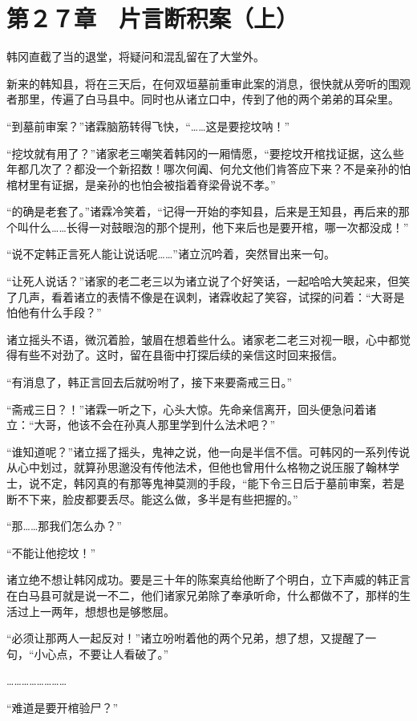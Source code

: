 \section{第２７章　片言断积案（上）}

韩冈直截了当的退堂，将疑问和混乱留在了大堂外。

新来的韩知县，将在三天后，在何双垣墓前重审此案的消息，很快就从旁听的围观者那里，传遍了白马县中。同时也从诸立口中，传到了他的两个弟弟的耳朵里。

“到墓前审案？”诸霖脑筋转得飞快，“……这是要挖坟呐！”

“挖坟就有用了？”诸家老三嘲笑着韩冈的一厢情愿，“要挖坟开棺找证据，这么些年都几次了？都没一个新招数！哪次何阗、何允文他们肯答应下来？不是亲孙的怕棺材里有证据，是亲孙的也怕会被指着脊梁骨说不孝。”

“的确是老套了。”诸霖冷笑着，“记得一开始的李知县，后来是王知县，再后来的那个叫什么……长得一对鼓眼泡的那个提刑，他下来后也是要开棺，哪一次都没成！”

“说不定韩正言死人能让说话呢……”诸立沉吟着，突然冒出来一句。

“让死人说话？”诸家的老二老三以为诸立说了个好笑话，一起哈哈大笑起来，但笑了几声，看着诸立的表情不像是在讽刺，诸霖收起了笑容，试探的问着：“大哥是怕他有什么手段？”

诸立摇头不语，微沉着脸，皱眉在想着些什么。诸家老二老三对视一眼，心中都觉得有些不对劲了。这时，留在县衙中打探后续的亲信这时回来报信。

“有消息了，韩正言回去后就吩咐了，接下来要斋戒三日。”

“斋戒三日？！”诸霖一听之下，心头大惊。先命亲信离开，回头便急问着诸立：“大哥，他该不会在孙真人那里学到什么法术吧？”

“谁知道呢？”诸立摇了摇头，鬼神之说，他一向是半信不信。可韩冈的一系列传说从心中划过，就算孙思邈没有传他法术，但他也曾用什么格物之说压服了翰林学士，说不定，韩冈真的有那等鬼神莫测的手段，“能下令三日后于墓前审案，若是断不下来，脸皮都要丢尽。能这么做，多半是有些把握的。”

“那……那我们怎么办？”

“不能让他挖坟！”

诸立绝不想让韩冈成功。要是三十年的陈案真给他断了个明白，立下声威的韩正言在白马县可就是说一不二，他们诸家兄弟除了奉承听命，什么都做不了，那样的生活过上一两年，想想也是够憋屈。

“必须让那两人一起反对！”诸立吩咐着他的两个兄弟，想了想，又提醒了一句，“小心点，不要让人看破了。”

……………………

“难道是要开棺验尸？”

